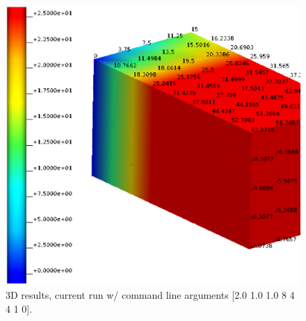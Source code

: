 \begin{figure}[h!]
    \centering 
    \includegraphics[width=0.9\columnwidth]{examples/example-0003/doc/figures/current_run_l2x1x1_n8x4x4_i1_s0.eps} 
    \caption{3D results, current run w/ command line arguments [2.0 1.0 1.0 8 4 4 1 0].}
    \label{example-0003-current-run-3D-fig}
\end{figure}
%
